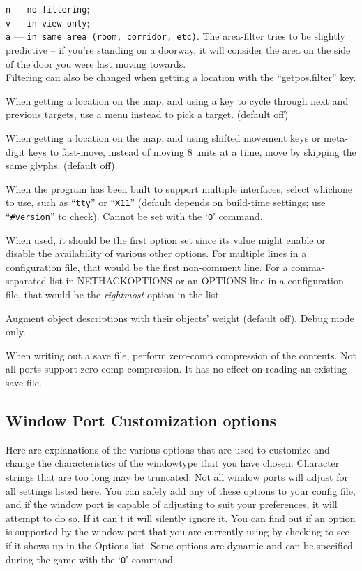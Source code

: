 {\tt n} --- \verb#no filtering#;\\
{\tt v} --- \verb#in view only#;\\
{\tt a} --- \verb#in same area (room, corridor, etc)#.
The area-filter tries to be slightly predictive -- if you're standing
on a doorway, it will consider the area on the side of the door you
were last moving towards.\\
Filtering can also be changed when getting a location with
the ``getpos.filter'' key.
\item[\ib{whatis\verb+_+menu}]
When getting a location on the map, and using a key to cycle through
next and previous targets, use a menu instead to pick a target.
(default off)
\item[\ib{whatis\verb+_+moveskip}]
When getting a location on the map, and using shifted movement keys or
meta-digit keys to fast-move, instead of moving 8 units at a time,
move by skipping the same glyphs.
(default off)
\item[\ib{windowtype}]
When the program has been built to support multiple interfaces,
select whichone to use, such as ``{\tt tty}'' or ``{\tt X11}''
(default depends on build-time settings; use ``{\tt \#version}'' to check).
Cannot be set with the `{\tt O}' command.

When used, it should be the first option set since its value might
enable or disable the availability of various other options.
For multiple lines in a configuration file, that would be the first
non-comment line.
For a comma-separated list in NETHACKOPTIONS or an OPTIONS line in a
configuration file, that would be the {\it rightmost\/} option in the list.
\item[\ib{wizweight}]
Augment object descriptions with their objects' weight (default off).
Debug mode only.
\item[\ib{zerocomp}]
When writing out a save file, perform zero-comp compression of the
contents. Not all ports support zero-comp compression. It has no effect
on reading an existing save file.
\elist

\subsection*{Window Port Customization options}

Here are explanations of the various options that are
used to customize and change the characteristics of the
windowtype that you have chosen.
Character strings that are too long may be truncated.
Not all window ports will adjust for all settings listed
here.  You can safely add any of these options to your
config file, and if the window port is capable of adjusting
to suit your preferences, it will attempt to do so. If it
can't it will silently ignore it.  You can find out if an
option is supported by the window port that you are currently
using by checking to see if it shows up in the Options list.
Some options are dynamic and can be specified during the game
with the `{\tt O}' command.


